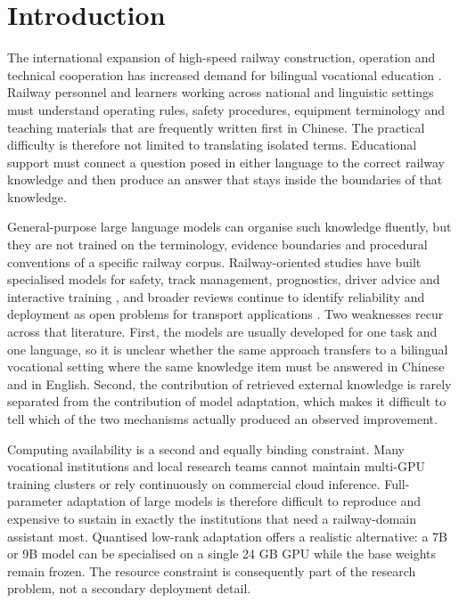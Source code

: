 \documentclass{article}
\begin{document}
\section{Introduction}

The international expansion of high-speed railway construction, operation and technical cooperation has increased demand for bilingual vocational education \citep{lawrence2019hsr,xu2018education}. Railway personnel and learners working across national and linguistic settings must understand operating rules, safety procedures, equipment terminology and teaching materials that are frequently written first in Chinese. The practical difficulty is therefore not limited to translating isolated terms. Educational support must connect a question posed in either language to the correct railway knowledge and then produce an answer that stays inside the boundaries of that knowledge.

General-purpose large language models can organise such knowledge fluently, but they are not trained on the terminology, evidence boundaries and procedural conventions of a specific railway corpus. Railway-oriented studies have built specialised models for safety, track management, prognostics, driver advice and interactive training \citep{zheng2023trafficsafety,li2024rschat,song2025railway,wang2024phm,luo2025driver,li2025training,huang2026emergency}, and broader reviews continue to identify reliability and deployment as open problems for transport applications \citep{wandelt2024transport}. Two weaknesses recur across that literature. First, the models are usually developed for one task and one language, so it is unclear whether the same approach transfers to a bilingual vocational setting where the same knowledge item must be answered in Chinese and in English. Second, the contribution of retrieved external knowledge is rarely separated from the contribution of model adaptation, which makes it difficult to tell which of the two mechanisms actually produced an observed improvement.

Computing availability is a second and equally binding constraint. Many vocational institutions and local research teams cannot maintain multi-GPU training clusters or rely continuously on commercial cloud inference. Full-parameter adaptation of large models is therefore difficult to reproduce and expensive to sustain in exactly the institutions that need a railway-domain assistant most. Quantised low-rank adaptation offers a realistic alternative: a 7B or 9B model can be specialised on a single 24 GB GPU while the base weights remain frozen. The resource constraint is consequently part of the research problem, not a secondary deployment detail.
\end{document}
